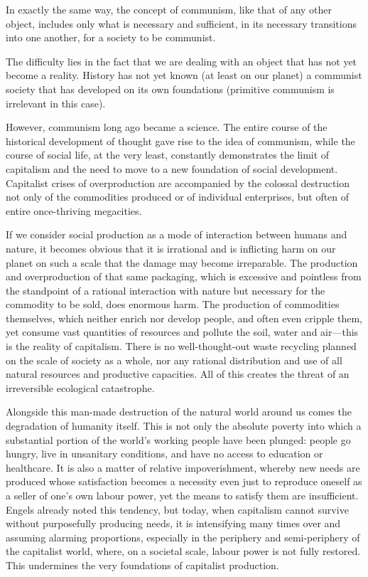 \documentclass[12pt,a4paper,openany]{book}
\begin{document}
In exactly the same way, the concept of communism, like that of any other object, includes only what is necessary and sufficient, in its necessary transitions into one another, for a society to be communist.

The difficulty lies in the fact that we are dealing with an object that has not yet become a reality. History has not yet known (at least on our planet) a communist society that has developed on its own foundations (primitive communism is irrelevant in this case).

However, communism long ago became a science. The entire course of the historical development of thought gave rise to the idea of communism, while the course of social life, at the very least, constantly demonstrates the limit of capitalism and the need to move to a new foundation of social development. Capitalist crises of overproduction are accompanied by the colossal destruction not only of the commodities produced or of individual enterprises, but often of entire once-thriving megacities.

If we consider social production as a mode of interaction between humans and nature, it becomes obvious that it is irrational and is inflicting harm on our planet on such a scale that the damage may become irreparable. The production and overproduction of that same packaging, which is excessive and pointless from the standpoint of a rational interaction with nature but necessary for the commodity to be sold, does enormous harm. The production of commodities themselves, which neither enrich nor develop people, and often even cripple them, yet consume vast quantities of resources and pollute the soil, water and air—this is the reality of capitalism. There is no well-thought-out waste recycling planned on the scale of society as a whole, nor any rational distribution and use of all natural resources and productive capacities. All of this creates the threat of an irreversible ecological catastrophe.

Alongside this man-made destruction of the natural world around us comes the degradation of humanity itself. This is not only the absolute poverty into which a substantial portion of the world's working people have been plunged: people go hungry, live in unsanitary conditions, and have no access to education or healthcare. It is also a matter of relative impoverishment, whereby new needs are produced whose satisfaction becomes a necessity even just to reproduce oneself as a seller of one's own labour power, yet the means to satisfy them are insufficient. Engels already noted this tendency, but today, when capitalism cannot survive without purposefully producing needs, it is intensifying many times over and assuming alarming proportions, especially in the periphery and semi-periphery of the capitalist world, where, on a societal scale, labour power is not fully restored. This undermines the very foundations of capitalist production.
\end{document}
